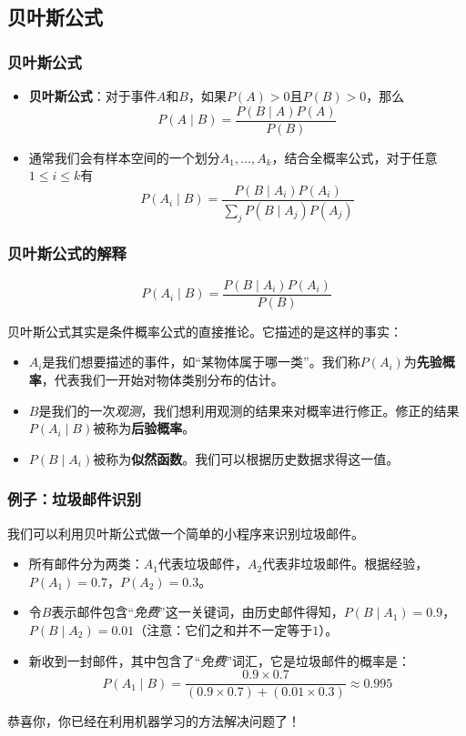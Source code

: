 \documentclass[9pt,dvipsnames]{beamer}
\begin{document}
\subsection{贝叶斯公式}
\begin{frame}
	\frametitle{贝叶斯公式}
	\begin{itemize}
		\item \textbf{贝叶斯公式}：对于事件$A$和$B$，如果$P(A)>0$且$P(B)>0$，那么
			\[ P(A\mid B) = \frac{P(B\mid A)P(A)}{P(B)} \]
		\item 通常我们会有样本空间的一个划分$A_1,\ldots,A_k$，结合全概率公式，对于任意$1\leq i\leq k$有
			\[ P(A_i\mid B) = \frac{P(B\mid A_i)P(A_i)}{\sum_j P(B\mid A_j)P(A_j)} \]
	\end{itemize}
\end{frame}
\begin{frame}
	\frametitle{贝叶斯公式的解释}
	\[ P(A_i\mid B) = \frac{P(B\mid A_i)P(A_i)}{P(B)} \]
	
	贝叶斯公式其实是条件概率公式的直接推论。它描述的是这样的事实：
	\begin{itemize}
		\item $A_i$是我们想要描述的事件，如``某物体属于哪一类''。我们称$P(A_i)$为\textbf{先验概率}，代表我们一开始对物体类别分布的估计。
		\item $B$是我们的一次\textit{观测}，我们想利用观测的结果来对概率进行修正。修正的结果$P(A_i\mid B)$被称为\textbf{后验概率}。
		\item $P(B\mid A_i)$被称为\textbf{似然函数}。我们可以根据历史数据求得这一值。
	\end{itemize}
\end{frame}
\begin{frame}
	\frametitle{例子：垃圾邮件识别}
	我们可以利用贝叶斯公式做一个简单的小程序来识别垃圾邮件。

	\begin{itemize}
		\item 所有邮件分为两类：$A_1$代表垃圾邮件，$A_2$代表非垃圾邮件。根据经验，$P(A_1)=0.7$，$P(A_2)=0.3$。
		\item 令$B$表示邮件包含``\textit{免费}''这一关键词，由历史邮件得知，$P(B\mid A_1)=0.9$，$P(B\mid A_2)=0.01$（注意：它们之和并不一定等于$1$）。
		\item 新收到一封邮件，其中包含了``\textit{免费}''词汇，它是垃圾邮件的概率是：\pause
			\[ P(A_1\mid B) = \frac{0.9\times 0.7}{(0.9\times 0.7)+(0.01\times 0.3)} \approx 0.995 \]
	\end{itemize} \pause

	恭喜你，你已经在利用机器学习的方法解决问题了！
\end{frame}
\end{document}
